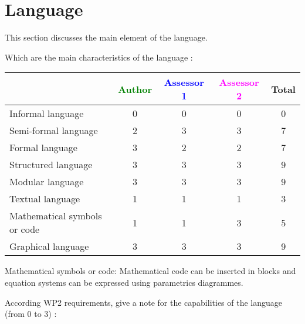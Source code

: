 \section{Language}
This section discusses the main element of the language.

Which are the main characteristics of the language :

\begin{tabular}{|l | c | c | c | c|}
\hline
& \textcolor{green}{Author} & \textcolor{blue}{Assessor 1} & \textcolor{magenta}{Assessor 2} & Total \\
\hline 
Informal language & 0 & 0 & 0 & 0 \\
\hline 
Semi-formal language & 2 & 3 & 3 & 7 \\
\hline
Formal language & 3 & 2 & 2 & 7 \\
\hline
Structured language &3 & 3 & 3 & 9 \\
\hline
Modular language &3 & 3 & 3 & 9 \\
\hline
Textual language & 1 & 1 & 1 & 3 \\
\hline
Mathematical symbols or code & 1 & 1 & 3 & 5 \\
\hline
Graphical language & 3 & 3 & 3 & 9 \\
\hline
\end{tabular}
\begin{assessor2}
Mathematical symbols or code: Mathematical code can be inserted in blocks and equation systems can be expressed using parametrics diagrammes.
\end{assessor2}



According WP2 requirements, give a note for the capabilities of the language (from 0 to 3) :

